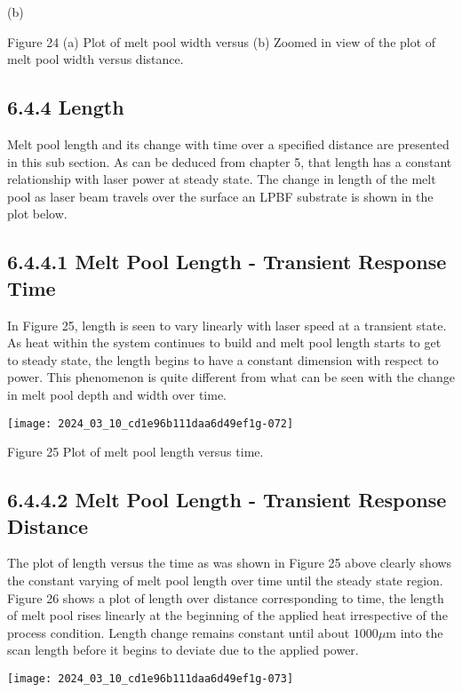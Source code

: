 \documentclass[10pt]{article}
\begin{document}
(b)

Figure 24 (a) Plot of melt pool width versus (b) Zoomed in view of the plot of melt pool width versus distance.

\subsection*{6.4.4 Length}
Melt pool length and its change with time over a specified distance are presented in this sub section. As can be deduced from chapter 5, that length has a constant relationship with laser power at steady state. The change in length of the melt pool as laser beam travels over the surface an LPBF substrate is shown in the plot below.

\subsection*{6.4.4.1 Melt Pool Length - Transient Response Time}
In Figure 25, length is seen to vary linearly with laser speed at a transient state. As heat within the system continues to build and melt pool length starts to get to steady state, the length begins to have a constant dimension with respect to power. This phenomenon is quite different from what can be seen with the change in melt pool depth and width over time.

\begin{center}
\texttt{[image: 2024\_03\_10\_cd1e96b111daa6d49ef1g-072]}
\end{center}

Figure 25 Plot of melt pool length versus time.

\subsection*{6.4.4.2 Melt Pool Length - Transient Response Distance}
The plot of length versus the time as was shown in Figure 25 above clearly shows the constant varying of melt pool length over time until the steady state region. Figure 26 shows a plot of length over distance corresponding to time, the length of melt pool rises linearly at the beginning of the applied heat irrespective of the process condition. Length change remains constant until about $1000 \mu \mathrm{m}$ into the scan length before it begins to deviate due to the applied power.

\begin{center}
\texttt{[image: 2024\_03\_10\_cd1e96b111daa6d49ef1g-073]}
\end{center}
\end{document}
